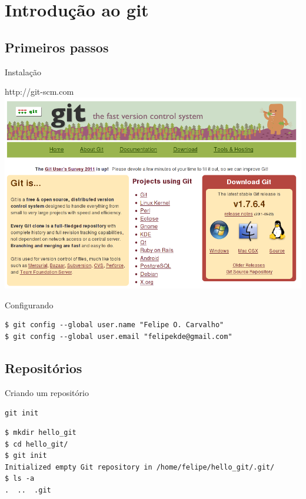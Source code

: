 \documentclass[portuguese,brazil]{beamer}
\newcommand\sectiontoc{
  \begin{frame}
    \tableofcontents[currentsection]
  \end{frame}
}
\begin{document}
\section{Introdução ao git}

\sectiontoc

\subsection{Primeiros passos}

\begin{frame}{Instalação}
\begin{center}
  http://git-scm.com
  \includegraphics[scale=.38]{images/gitscm.png}
\end{center}
\end{frame}

\begin{frame}[fragile]{Configurando}
\begin{verbatim}
$ git config --global user.name "Felipe O. Carvalho"
$ git config --global user.email "felipekde@gmail.com"
\end{verbatim}
\end{frame}

\subsection{Repositórios}

\begin{frame}[fragile]{Criando um repositório}
\begin{center}
\texttt{git init}
\end{center}
\begin{verbatim}
$ mkdir hello_git
$ cd hello_git/
$ git init
Initialized empty Git repository in /home/felipe/hello_git/.git/
$ ls -a
.  ..  .git
\end{verbatim}
\end{frame}
\end{document}
